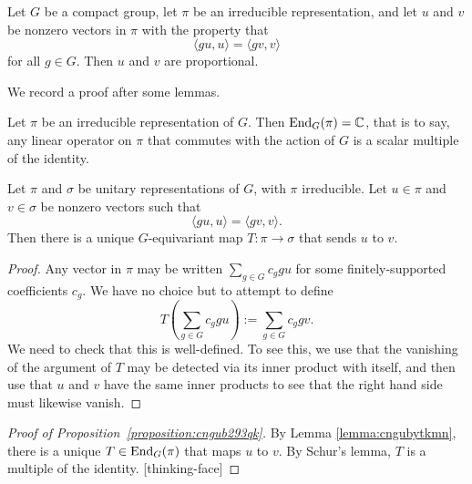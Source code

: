 \documentclass[reqno]{amsart} 
\begin{document}
\begin{proposition}\label{proposition:cngub293qk}
  Let $G$ be a compact group, let $\pi$ be an irreducible representation, and let $u$ and $v$ be nonzero vectors in $\pi$ with the property that
  \begin{equation}\label{eq:cngub3eab0}
    \langle g u, u \rangle = \langle g v, v \rangle
  \end{equation}
  for all $g \in G$.  Then $u$ and $v$ are proportional.
\end{proposition}
We record a proof after some lemmas.

\begin{lemma}\label{lemma:cngubyxnij}
  Let $\pi$ be an irreducible representation of $G$.  Then $\operatorname{End}_G(\pi) = \mathbb{C}$, that is to say, any linear operator on $\pi$ that commutes with the action of $G$ is a scalar multiple of the identity.
\end{lemma}

\begin{lemma}\label{lemma:cngubytkmn}
  Let $\pi$ and $\sigma$ be unitary representations of $G$, with $\pi$ irreducible.  Let $u \in \pi$ and $v \in \sigma$ be nonzero vectors such that
  \begin{equation*}
    \langle g u, u \rangle = \langle g v, v \rangle.
  \end{equation*}
  Then there is a unique $G$-equivariant map $T : \pi \rightarrow \sigma$ that sends $u$ to $v$.  
\end{lemma}
\begin{proof}
  Any vector in $\pi$ may be written $\sum_{g \in G} c_g g u$ for some finitely-supported coefficients $c_g$.  We have no choice but to attempt to define
  \begin{equation*}
    T \left( \sum_{g \in G} c_g g u \right) := \sum_{g \in G} c_g g v.
  \end{equation*}
  We need to check that this is well-defined.  To see this, we use that the vanishing of the argument of $T$ may be detected via its inner product with itself, and then use that $u$ and $v$ have the same inner products to see that the right hand side must likewise vanish.
\end{proof}

\begin{proof}[Proof of Proposition~\ref{proposition:cngub293qk}]
  By Lemma \ref{lemma:cngubytkmn}, there is a unique $T \in \operatorname{End}_G(\pi)$ that maps $u$ to $v$.  By Schur's lemma, $T$ is a multiple of the identity.  [thinking-face]
\end{proof}


{} 
\end{document}
